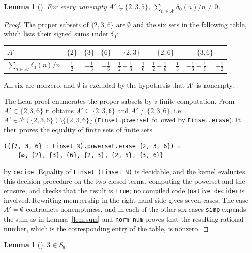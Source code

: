 \documentclass[11pt]{amsart}
\theoremstyle{plain}
\newtheorem{lemma}[theorem]{Lemma}
\theoremstyle{definition}
\begin{document}
\begin{lemma}[]\label{lem:proper}
For every nonempty $A'\subsetneq\{2,3,6\}$, $\sum_{n\in A'}\delta_0(n)/n\ne 0$.
\end{lemma}

\begin{proof}
The proper subsets of $\{2,3,6\}$ are $\emptyset$ and the six sets in the following table, which lists their signed sums under $\delta_0$:
\begin{center}
\begin{tabular}{@{}lcccccc@{}}
\toprule
$A'$ & $\{2\}$ & $\{3\}$ & $\{6\}$ & $\{2,3\}$ & $\{2,6\}$ & $\{3,6\}$\\
\midrule
$\sum_{n\in A'}\delta_0(n)/n$ & $\frac12$ & $-\frac13$ & $-\frac16$ & $\frac12-\frac13=\frac16$ & $\frac12-\frac16=\frac13$ & $-\frac13-\frac16=-\frac12$\\
\bottomrule
\end{tabular}
\end{center}
All six are nonzero, and $\emptyset$ is excluded by the hypothesis that $A'$ is nonempty.

The Lean proof enumerates the proper subsets by a finite computation. From $A'\subset\{2,3,6\}$ it obtains $A'\subseteq\{2,3,6\}$ and $A'\ne\{2,3,6\}$, i.e.\ $A'\in\mathcal P(\{2,3,6\})\setminus\{\{2,3,6\}\}$ (\texttt{Finset.powerset} followed by \texttt{Finset.erase}). It then proves the equality of finite sets of finite sets
\begin{lstlisting}
(({2, 3, 6} : Finset ℕ).powerset.erase {2, 3, 6}) =
    {∅, {2}, {3}, {6}, {2, 3}, {2, 6}, {3, 6}}
\end{lstlisting}
by \texttt{decide}. Equality of \texttt{Finset (Finset ℕ)} is decidable, and the kernel evaluates this decision procedure on the two closed terms, computing the powerset and the erasure, and checks that the result is \texttt{true}; no compiled code (\texttt{native\_decide}) is involved. Rewriting membership in the right-hand side gives seven cases. The case $A'=\emptyset$ contradicts nonemptiness, and in each of the other six cases \texttt{simp} expands the sum as in Lemma~\ref{lem:sum} and \texttt{norm\_num} proves that the resulting rational number, which is the corresponding entry of the table, is nonzero.
\end{proof}

\begin{lemma}[]\label{lem:S6}
$3\in S_6$.
\end{lemma}
\end{document}
